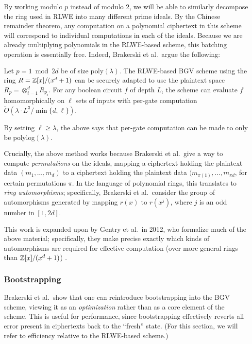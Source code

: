     By working modulo $p$ instead of modulo $2$, we will be able to similarly decompose the ring used in RLWE into many different prime ideals. By the Chinese remainder theorem, any computation on a polynomial ciphertext in this scheme will correspond to individual computations in each of the ideals. Because we are already multiplying polynomials in the RLWE-based scheme, this batching operation is essentially free. Indeed, Brakerski et al.~argue the following:
    \begin{lemma}
        Let $p = 1 \bmod 2d$ be of size poly$(\lambda).$ The RLWE-based BGV scheme using the ring $R = \mathbb{Z}[x] / (x^d + 1)$ can be securely adapted to use the plaintext space $R_p = \otimes_{i = 1}^d R_{\mathfrak{p}_i}$. For any boolean circuit $f$ of depth $L$, the scheme can evaluate $f$ homomorphically on $\ell$ sets of inputs with per-gate computation $\widetilde{O}(\lambda \cdot L^3 / \min\{d, \ell\}).$
    \end{lemma}
    By setting $\ell \geq \lambda$, the above says that per-gate computation can be made to only be polylog$(\lambda)$.

    Crucially, the above method works because Brakerski et al.~give a way to compute \emph{permutations} on the ideals, mapping a ciphertext holding the plaintext data $(m_1, \dots, m_d)$ to a ciphertext holding the plaintext data $(m_{\pi(1)}, \dots, m_{\pi{d}}$, for certain permutations $\pi$. In the language of polynomial rings, this translates to \emph{ring automorphisms}; specifically, Brakerski et al.~consider the group of automorphisms generated by mapping $r(x)$ to $r(x^j)$, where $j$ is an odd number in $[1, 2d]$.

    This work is expanded upon by Gentry et al.~in 2012, who formalize much of the above material; specifically, they make precise exactly which kinds of automorphisms are required for effective computation (over more general rings than $\mathbb{Z}[x] / (x^d + 1)$) \cite{Gentry2012}.


    \subsubsection{Bootstrapping}
        Brakerski et al.~show that one can reintroduce bootstrapping into the BGV scheme, viewing it as an \emph{optimization} rather than as a core element of the scheme. This is useful for performance, since bootstrapping effectively reverts all error present in ciphertexts back to the ``fresh'' state. (For this section, we will refer to efficiency relative to the RLWE-based scheme.)

